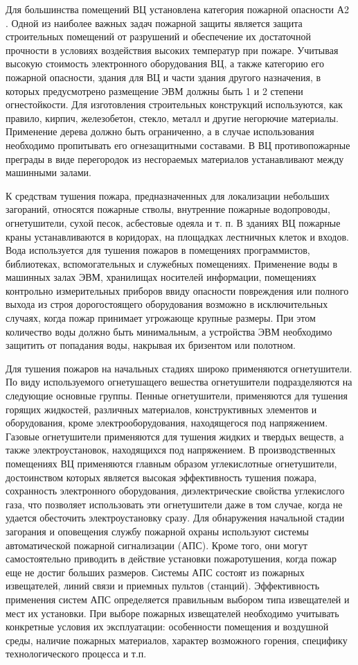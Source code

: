 Для большинства помещений ВЦ установлена категория пожарной опасности А2 \cite{sec41}. Одной из наиболее важных задач пожарной защиты
является защита строительных помещений от разрушений и обеспечение их достаточной прочности в условиях воздействия
высоких температур при пожаре. Учитывая высокую стоимость электронного оборудования ВЦ, а также категорию его
пожарной опасности, здания для ВЦ и части здания другого назначения, в которых предусмотрено размещение ЭВМ должны
быть 1 и 2 степени огнестойкости. Для изготовления строительных конструкций используются, как правило, кирпич,
железобетон, стекло, металл и другие негорючие материалы. Применение дерева должно быть ограниченно, а в
случае использования необходимо пропитывать его огнезащитными составами. В ВЦ противопожарные преграды в виде
перегородок из несгораемых материалов устанавливают между машинными залами.

К средствам тушения пожара, предназначенных для локализации небольших загораний, относятся пожарные стволы,
внутренние пожарные водопроводы, огнетушители, сухой песок, асбестовые одеяла и т. п. В зданиях ВЦ пожарные
краны устанавливаются в коридорах, на площадках лестничных клеток и входов. Вода используется для тушения пожаров
в помещениях программистов, библиотеках, вспомогательных и служебных помещениях. Применение воды в машинных залах
ЭВМ, хранилищах носителей информации, помещениях контрольно измерительных приборов ввиду опасности повреждения или
полного выхода из строя дорогостоящего оборудования возможно в исключительных случаях, когда пожар принимает
угрожающе крупные размеры. При этом количество воды должно быть минимальным, а устройства ЭВМ необходимо защитить
от попадания воды, накрывая их бризентом или полотном.

Для тушения пожаров на начальных стадиях широко применяются огнетушители. По виду используемого огнетушащего
вешества огнетушители подразделяются на следующие основные группы. Пенные огнетушители, применяются для тушения
горящих жидкостей, различных материалов, конструктивных элементов и оборудования, кроме электрооборудования,
находящегося под напряжением. Газовые огнетушители применяются для тушения жидких и твердых веществ, а также
электроустановок, находящихся под напряжением. В производственных помещениях ВЦ применяются главным образом
углекислотные огнетушители, достоинством которых является высокая эффективность тушения пожара, сохранность
электронного оборудования, диэлектрические свойства углекислого газа, что позволяет использовать эти огнетушители
даже в том случае, когда не удается обесточить электроустановку сразу. Для обнаружения начальной стадии
загорания и оповещения службу пожарной охраны используют системы автоматической пожарной сигнализации (АПС).
Кроме того, они могут самостоятельно приводить в действие установки пожаротушения, когда пожар еще не достиг
больших размеров. Системы АПС состоят из пожарных извещателей, линий связи и приемных пультов (станций).
Эффективность применения систем АПС определяется правильным выбором типа извещателей и мест их установки.
При выборе пожарных извещателей необходимо учитывать конкретные условия их эксплуатации: особенности помещения и
воздушной среды, наличие пожарных материалов, характер возможного горения, специфику технологического процесса и т.п.

